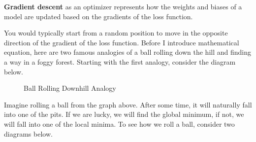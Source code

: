 \documentclass[../../main.tex]{subfiles}
\begin{document}
\begin{definition}{}{}
\textbf{Gradient descent} as an optimizer represents how the weights
and biases of a model are updated based on the gradients of the loss
function.
\end{definition}

You would typically start from a random position to move in the
opposite direction of the gradient of the loss function.
Before I introduce mathematical equation, here are two famous
analogies of a ball rolling down the hill and finding a way in a
foggy forest. Starting with the first analogy, consider the
diagram below.

\begin{figure}[H]
\centering
{}
\caption{Ball Rolling Downhill Analogy}
\end{figure}

Imagine rolling a ball from the graph above. After some time, it will
naturally fall into one of the pits. If we are lucky, we will find
the global minimum, if not, we will fall into one of the local minima.
To see how we roll a ball, consider two diagrams below.
\end{document}
